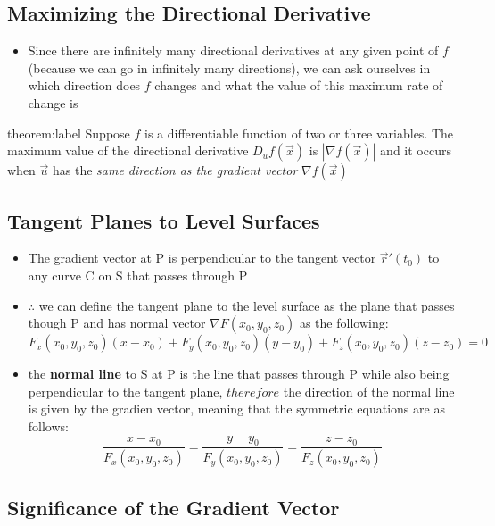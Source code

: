 \documentclass{package/notes}
\begin{document}
\subsection{Maximizing the Directional Derivative}

\begin{itemize}
	\item Since there are infinitely many directional derivatives at any given point of $f$ (because we can go in infinitely many directions), we can ask ourselves in which direction does $f$ changes and what the value of this maximum rate of change is
\end{itemize}

\begin{theorem}{theorem:label}
	Suppose $f$ is a differentiable function of two or three variables. The maximum value of the directional derivative $D_uf(\vec x)$ is $|\nabla f(\vec x)|$ and it occurs when $\vec u$ has the \textit{same direction as the gradient vector} $\nabla f(\vec x)$
\end{theorem}


\subsection{Tangent Planes to Level Surfaces}

\begin{itemize}
	\item The gradient vector at P is perpendicular to the tangent vector $\vec r'(t_0)$ to any curve C on S that passes through P
	\item $\therefore$ we can define the tangent plane to the level surface as the plane that passes though P and has normal vector $\nabla F(x_0,y_0,z_0)$ as the following:
	$$F_x(x_0,y_0,z_0)(x-x_0) + F_y(x_0,y_0,z_0)(y-y_0)+F_z(x_0,y_0,z_0)(z-z_0)=0$$
	\item the \textbf{normal line} to S at P is the line that passes through P while also being perpendicular to the tangent plane, $therefore$ the direction of the normal line is given by the gradien vector, meaning that the symmetric equations are as follows:
	$$\frac{x-x_0}{F_x(x_0,y_0,z_0)} = \frac{y-y_0}{F_y(x_0,y_0,z_0)}=\frac{z-z_0}{F_z(x_0,y_0,z_0)}$$
\end{itemize}


\subsection{Significance of the Gradient Vector}
\end{document}
